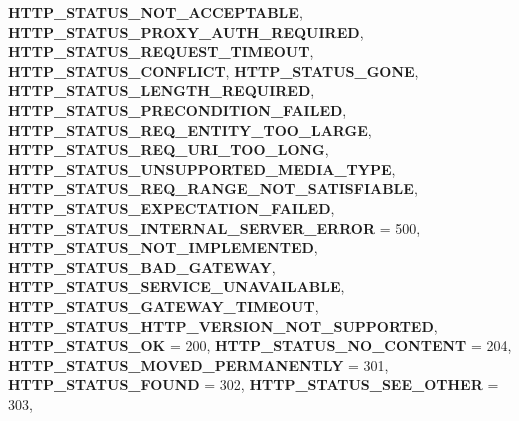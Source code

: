 \begin{DoxyCompactItemize}
{\bfseries H\+T\+T\+P\+\_\+\+S\+T\+A\+T\+U\+S\+\_\+\+N\+O\+T\+\_\+\+A\+C\+C\+E\+P\+T\+A\+B\+LE}, 
{\bfseries H\+T\+T\+P\+\_\+\+S\+T\+A\+T\+U\+S\+\_\+\+P\+R\+O\+X\+Y\+\_\+\+A\+U\+T\+H\+\_\+\+R\+E\+Q\+U\+I\+R\+ED}, 
{\bfseries H\+T\+T\+P\+\_\+\+S\+T\+A\+T\+U\+S\+\_\+\+R\+E\+Q\+U\+E\+S\+T\+\_\+\+T\+I\+M\+E\+O\+UT}, 
{\bfseries H\+T\+T\+P\+\_\+\+S\+T\+A\+T\+U\+S\+\_\+\+C\+O\+N\+F\+L\+I\+CT}, 
\newline
{\bfseries H\+T\+T\+P\+\_\+\+S\+T\+A\+T\+U\+S\+\_\+\+G\+O\+NE}, 
{\bfseries H\+T\+T\+P\+\_\+\+S\+T\+A\+T\+U\+S\+\_\+\+L\+E\+N\+G\+T\+H\+\_\+\+R\+E\+Q\+U\+I\+R\+ED}, 
{\bfseries H\+T\+T\+P\+\_\+\+S\+T\+A\+T\+U\+S\+\_\+\+P\+R\+E\+C\+O\+N\+D\+I\+T\+I\+O\+N\+\_\+\+F\+A\+I\+L\+ED}, 
{\bfseries H\+T\+T\+P\+\_\+\+S\+T\+A\+T\+U\+S\+\_\+\+R\+E\+Q\+\_\+\+E\+N\+T\+I\+T\+Y\+\_\+\+T\+O\+O\+\_\+\+L\+A\+R\+GE}, 
\newline
{\bfseries H\+T\+T\+P\+\_\+\+S\+T\+A\+T\+U\+S\+\_\+\+R\+E\+Q\+\_\+\+U\+R\+I\+\_\+\+T\+O\+O\+\_\+\+L\+O\+NG}, 
{\bfseries H\+T\+T\+P\+\_\+\+S\+T\+A\+T\+U\+S\+\_\+\+U\+N\+S\+U\+P\+P\+O\+R\+T\+E\+D\+\_\+\+M\+E\+D\+I\+A\+\_\+\+T\+Y\+PE}, 
{\bfseries H\+T\+T\+P\+\_\+\+S\+T\+A\+T\+U\+S\+\_\+\+R\+E\+Q\+\_\+\+R\+A\+N\+G\+E\+\_\+\+N\+O\+T\+\_\+\+S\+A\+T\+I\+S\+F\+I\+A\+B\+LE}, 
{\bfseries H\+T\+T\+P\+\_\+\+S\+T\+A\+T\+U\+S\+\_\+\+E\+X\+P\+E\+C\+T\+A\+T\+I\+O\+N\+\_\+\+F\+A\+I\+L\+ED}, 
\newline
{\bfseries H\+T\+T\+P\+\_\+\+S\+T\+A\+T\+U\+S\+\_\+\+I\+N\+T\+E\+R\+N\+A\+L\+\_\+\+S\+E\+R\+V\+E\+R\+\_\+\+E\+R\+R\+OR} = 500, 
{\bfseries H\+T\+T\+P\+\_\+\+S\+T\+A\+T\+U\+S\+\_\+\+N\+O\+T\+\_\+\+I\+M\+P\+L\+E\+M\+E\+N\+T\+ED}, 
{\bfseries H\+T\+T\+P\+\_\+\+S\+T\+A\+T\+U\+S\+\_\+\+B\+A\+D\+\_\+\+G\+A\+T\+E\+W\+AY}, 
{\bfseries H\+T\+T\+P\+\_\+\+S\+T\+A\+T\+U\+S\+\_\+\+S\+E\+R\+V\+I\+C\+E\+\_\+\+U\+N\+A\+V\+A\+I\+L\+A\+B\+LE}, 
\newline
{\bfseries H\+T\+T\+P\+\_\+\+S\+T\+A\+T\+U\+S\+\_\+\+G\+A\+T\+E\+W\+A\+Y\+\_\+\+T\+I\+M\+E\+O\+UT}, 
{\bfseries H\+T\+T\+P\+\_\+\+S\+T\+A\+T\+U\+S\+\_\+\+H\+T\+T\+P\+\_\+\+V\+E\+R\+S\+I\+O\+N\+\_\+\+N\+O\+T\+\_\+\+S\+U\+P\+P\+O\+R\+T\+ED}, 
{\bfseries H\+T\+T\+P\+\_\+\+S\+T\+A\+T\+U\+S\+\_\+\+OK} = 200, 
{\bfseries H\+T\+T\+P\+\_\+\+S\+T\+A\+T\+U\+S\+\_\+\+N\+O\+\_\+\+C\+O\+N\+T\+E\+NT} = 204, 
\newline
{\bfseries H\+T\+T\+P\+\_\+\+S\+T\+A\+T\+U\+S\+\_\+\+M\+O\+V\+E\+D\+\_\+\+P\+E\+R\+M\+A\+N\+E\+N\+T\+LY} = 301, 
{\bfseries H\+T\+T\+P\+\_\+\+S\+T\+A\+T\+U\+S\+\_\+\+F\+O\+U\+ND} = 302, 
{\bfseries H\+T\+T\+P\+\_\+\+S\+T\+A\+T\+U\+S\+\_\+\+S\+E\+E\+\_\+\+O\+T\+H\+ER} = 303, 

\end{DoxyCompactItemize}
